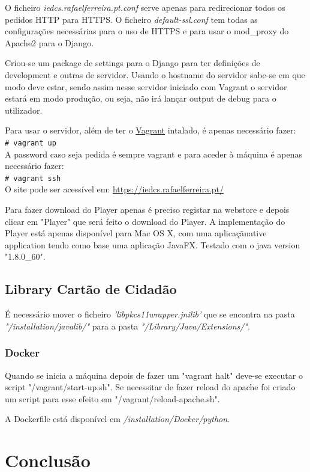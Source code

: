 \documentclass[pdftex,12pt,a4paper]{report}
\newcommand{\shellcmd}[1]{\\\indent\indent\texttt{\footnotesize\# #1}\\}
\begin{document}
O ficheiro \textit{iedcs.rafaelferreira.pt.conf} serve apenas para redirecionar todos os pedidos HTTP para HTTPS. O ficheiro \textit{default-ssl.conf} tem todas as configurações necessárias para o uso de HTTPS e para usar o mod\_proxy do Apache2 para o Django.

Criou-se um package de settings para o Django para ter definições de development e outras de servidor. Usando o hostname do servidor sabe-se em que modo deve estar, sendo assim nesse servidor iniciado com Vagrant o servidor estará em modo produção, ou seja, não irá lançar output de debug para o utilizador.

Para usar o servidor, além de ter o \href{https://www.vagrantup.com/downloads.html}{Vagrant} intalado, é apenas necessário fazer:
\shellcmd{vagrant up}

A password caso seja pedida é sempre vagrant e para aceder à máquina é apenas necessário fazer: \shellcmd{vagrant ssh}

O site pode ser acessível em: \url{https://iedcs.rafaelferreira.pt/}

Para fazer download do Player apenas é preciso registar na webstore e depois clicar em "Player" que será feito o download do Player. A implementação do Player está apenas disponível para Mac OS X, com uma aplicaçãnative application  tendo como base uma aplicação JavaFX. Testado com o java version "1.8.0{\_}60".

\subsection{Library Cartão de Cidadão}
É necessário mover o ficheiro  \textit{'libpkcs11wrapper.jnilib'} que se encontra na pasta  \textit{"/installation/javalib/"} para a pasta  \textit{"/Library/Java/Extensions/"}.

\subsubsection{Docker}
Quando se inicia a máquina depois de fazer um "vagrant halt" deve-se executar o script "/vagrant/start-up.sh". Se necessitar de fazer reload do apache foi criado um script para esse efeito em "/vagrant/reload-apache.sh".

A Dockerfile está disponível em \textit{/installation/Docker/python}.

\section{Conclusão}
\end{document}

